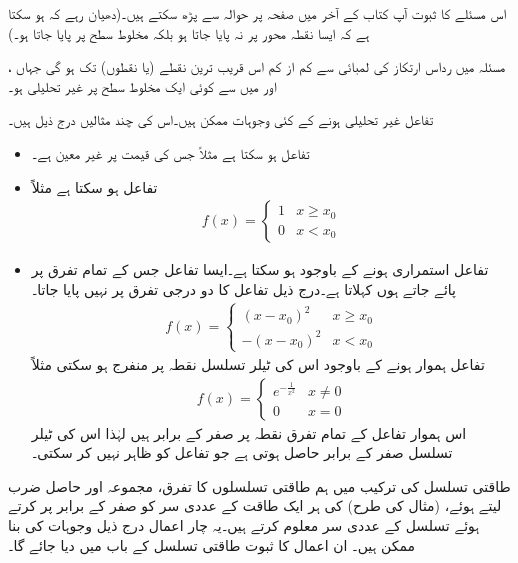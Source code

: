 اس مسئلے کا ثبوت آپ کتاب کے آخر میں صفحہ  پر حوالہ \cite{حوالہ_کریزگ_الف_گیارہ} سے پڑھ سکتے ہیں۔(دھیان رہے کہ ہو سکتا ہے کہ ایسا نقطہ  محور پر نہ پایا جاتا ہو بلکہ مخلوط سطح پر پایا جاتا ہو۔)

مسئلہ  میں  رداس ارتکاز  کی لمبائی  سے کم از کم اس قریب ترین نقطے (یا نقطوں) تک ہو گی جہاں  ،  اور   میں سے کوئی ایک مخلوط سطح پر غیر تحلیلی ہو۔

تفاعل غیر تحلیلی ہونے کے کئی وجوہات ممکن ہیں۔اس کی چند مثالیں درج ذیل ہیں۔
\begin{itemize}
\item
تفاعل  ہو سکتا ہے مثلاً  جس کی قیمت  پر غیر معین ہے۔
\item
تفاعل  ہو سکتا ہے مثلاً 
\begin{align*}
f(x)=
\begin{cases}
1&x\ge x_0\\
0& x<x_0
\end{cases}
\end{align*}
%
\item
تفاعل استمراری ہونے کے باوجود  ہو سکتا ہے۔ایسا تفاعل جس کے تمام تفرق  پر پائے جاتے ہوں  کہلاتا ہے۔درج ذیل تفاعل کا دو درجی تفرق  پر نہیں پایا جاتا۔
\begin{align*}
f(x)=
\begin{cases}
(x-x_0)^2&x\ge x_0\\
-(x-x_0)^2& x<x_0
\end{cases}
\end{align*}
%
تفاعل ہموار ہونے کے باوجود اس کی ٹیلر تسلسل نقطہ  پر منفرج  ہو سکتی مثلاً
\begin{align*}
f(x)=
\begin{cases}
e^{-\frac{1}{x^2}}&x\ne 0\\
0& x=0
\end{cases}
\end{align*}
اس ہموار تفاعل کے تمام تفرق نقطہ  پر صفر کے برابر ہیں لہٰذا  اس کی ٹیلر تسلسل صفر کے برابر حاصل ہوتی ہے جو تفاعل کو ظاہر نہیں کر سکتی۔ 
%
\end{itemize}

طاقتی تسلسل کی ترکیب میں ہم طاقتی تسلسلوں کا تفرق، مجموعہ اور  حاصل ضرب لیتے ہوئے، (مثال  کی طرح)  کی ہر ایک طاقت کے عددی سر کو صفر کے برابر پر کرتے ہوئے تسلسل  کے عددی سر معلوم کرتے ہیں۔یہ چار اعمال درج ذیل وجوہات کی بنا ممکن ہیں۔ ان اعمال کا ثبوت طاقتی تسلسل کے باب میں دیا جائے گا۔

